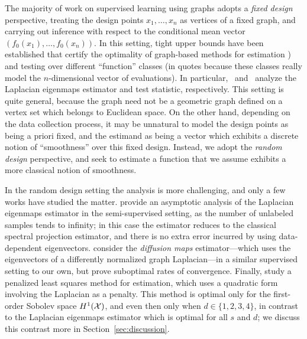 The majority of work on supervised learning using graphs adopts a \emph{fixed design} perspective, treating the design points $x_1,\ldots,x_n$ as vertices of a fixed graph, and carrying out inference with respect to the conditional mean vector $(f_0(x_1),\ldots,f_0(x_n))$. In this setting, tight upper bounds have been established that certify the optimality of graph-based methods for estimation \citep{wang2016,hutter2016,sadhanala16,sadhanala17,kirichenko2017,kirichenko2018}) and testing \citep{sharpnack2010identifying,sharpnack2013b,sharpnack2013,sharpnack2015} over different ``function'' classes (in quotes because these classes really model the $n$-dimensional vector of evaluations). In particular,~\citet{sadhanala16} and~\citet{sharpnack2015} analyze the Laplacian eigenmaps estimator and test statistic, respectively. This setting is quite general, because the graph need not be a geometric graph defined on a vertex set which belongs to Euclidean space. On the other hand, depending on the data collection process, it may be unnatural to model the design points as being a priori fixed, and the estimand as being a vector which exhibits a discrete notion of ``smoothness'' over this fixed design. Instead, we adopt the \emph{random design} perspective, and seek to estimate a function that we assume exhibits a more classical notion of smoothness. 

In the random design setting the analysis is more challenging, and only a few works have studied the matter. \cite{zhou2011} provide an asymptotic analysis of the Laplacian eigenmaps estimator in the semi-supervised setting, as the number of unlabeled samples tends to infinity; in this case the estimator reduces to the classical spectral projection estimator, and there is no extra error incurred by using data-dependent eigenvectors. \cite{lee2016} consider the \emph{diffusion maps} estimator---which uses the eigenvectors of a differently normalized graph Laplacian---in a similar supervised setting to our own, but prove suboptimal rates of convergence. Finally, \citet{trillos2020,green2021} study a penalized least squares method for estimation, which uses a quadratic form involving the Laplacian as a penalty. This method is optimal only for the first-order Sobolev space $H^1(\mathcal{X})$, and even then only when $d \in \{1,2,3,4\}$, in contrast to the Laplacian eigenmaps estimator which is optimal for all $s$ and $d$; we discuss this contrast more in Section~\ref{sec:discussion}.

